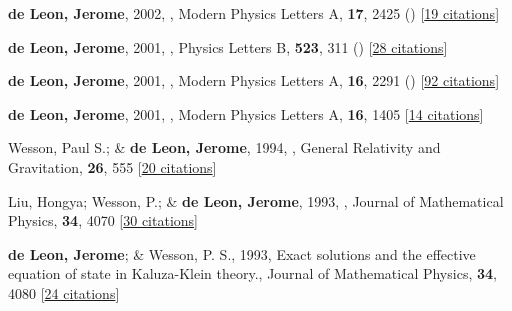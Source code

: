 \item[{\color{numcolor}\scriptsize9}] \textbf{de Leon, Jerome}, 2002, , Modern Physics Letters A, \textbf{17}, 2425 () [\href{https://ui.adsabs.harvard.edu/abs/2002MPLA...17.2425D}{19 citations}]

\item[{\color{numcolor}\scriptsize8}] \textbf{de Leon, Jerome}, 2001, , Physics Letters B, \textbf{523}, 311 () [\href{https://ui.adsabs.harvard.edu/abs/2001PhLB..523..311D}{28 citations}]

\item[{\color{numcolor}\scriptsize7}] \textbf{de Leon, Jerome}, 2001, , Modern Physics Letters A, \textbf{16}, 2291 () [\href{https://ui.adsabs.harvard.edu/abs/2001MPLA...16.2291D}{92 citations}]

\item[{\color{numcolor}\scriptsize6}] \textbf{de Leon, Jerome}, 2001, , Modern Physics Letters A, \textbf{16}, 1405 [\href{https://ui.adsabs.harvard.edu/abs/2001MPLA...16.1405D}{14 citations}]

\item[{\color{numcolor}\scriptsize5}] Wesson, Paul S.; \& \textbf{de Leon, Jerome}, 1994, , General Relativity and Gravitation, \textbf{26}, 555 [\href{https://ui.adsabs.harvard.edu/abs/1994GReGr..26..555W}{20 citations}]

\item[{\color{numcolor}\scriptsize4}] Liu, Hongya; Wesson, P.; \& \textbf{de Leon, Jerome}, 1993, , Journal of Mathematical Physics, \textbf{34}, 4070 [\href{https://ui.adsabs.harvard.edu/abs/1993JMP....34.4070L}{30 citations}]

\item[{\color{numcolor}\scriptsize3}] \textbf{de Leon, Jerome}; \& Wesson, P. S., 1993, Exact solutions and the effective equation of state in Kaluza-Klein theory., Journal of Mathematical Physics, \textbf{34}, 4080 [\href{https://ui.adsabs.harvard.edu/abs/1993JMP....34.4080D}{24 citations}]

